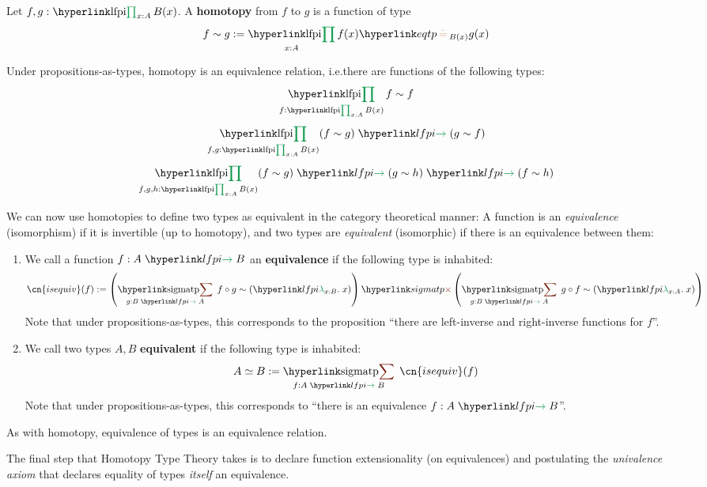 \begin{definition}
	Let $f,g:\lfpi{x:A}B(x)$. A \textbf{homotopy} from $f$ to $g$ is a function of type
		\[f\sim g := \lfpi{x:A}{\eqtp{f(x)}{g(x)}{B(x)}}\]
\end{definition}
\begin{theorem}
Under propositions-as-types, homotopy is an equivalence relation, i.e.there are functions of the following types:
\[\lfpi{f:\lfpi{x:A}{B(x)}}{f\sim f}\]
\[\lfpi{f,g:\lfpi{x:A}{B(x)}}{\lfarrow{(f\sim g)}{(g\sim f)}}\]
\[\lfpi{f,g,h:\lfpi{x:A}{B(x)}}{\lfarrow{(f\sim g)}{\lfarrow{(g\sim h)}{(f\sim h)}}}\]
\end{theorem}

We can now use homotopies to define two types as equivalent in the category theoretical manner: A function is an \emph{equivalence} (isomorphism) if it is invertible (up to homotopy), and two types are \emph{equivalent} (isomorphic) if there is an equivalence between them:

\begin{definition}
	\begin{enumerate}
		\item We call a function $f:\lfarrow AB$ an \textbf{equivalence} if the following type is inhabited:
			\[  \cn{isequiv}(f):=\simpleprod{\left(\sigmatp{g:\lfarrow BA}{f\circ g\sim \left(\lflambda{x:B}x\right)}\right)}{\left(\sigmatp{g:\lfarrow BA}{g\circ f\sim \left(\lflambda{x:A}x\right)}\right)} \]
			Note that under propositions-as-types, this corresponds to the proposition ``there are left-inverse and right-inverse functions for $f$''.
			\forcebreakhere
		\item We call two types $A,B$ \textbf{equivalent} if the following type is inhabited:
			\[ A\simeq B:=\sigmatp{f:\lfarrow AB}{\cn{isequiv}(f)}\]
			Note that under propositions-as-types, this corresponds to ``there is an equivalence $f:\lfarrow AB$''.
	\end{enumerate}
\end{definition}
\begin{theorem}
	As with homotopy, equivalence of types is an equivalence relation.
\end{theorem}

The final step that Homotopy Type Theory takes is to declare function extensionality (on equivalences) and postulating the \emph{univalence axiom} that declares equality of types \emph{itself} an equivalence.

